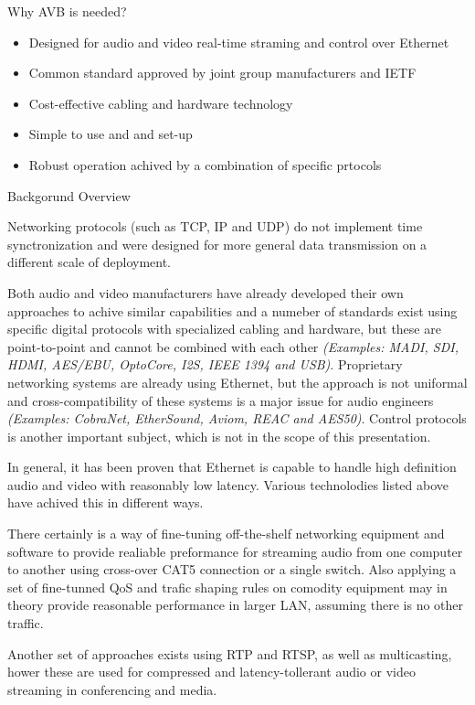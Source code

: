 { Why AVB is needed? }

\begin{itemize}
	\item Designed for audio and video real-time straming and control over Ethernet
	\item Common standard approved by joint group manufacturers and IETF
	\item Cost-effective cabling and hardware technology
	\item Simple to use and and set-up
	\item Robust operation achived by a combination of specific prtocols
\end{itemize}

{ Backgorund Overview }

Networking protocols (such as TCP, IP and UDP) do not implement time synctronization and
were designed for more general data transmission on a different scale of deployment.

Both audio and video manufacturers have already developed their own approaches to achive
similar capabilities and a numeber of standards exist using specific digital protocols with
specialized cabling and hardware, but these are point-to-point and cannot be combined with each other
\emph{(Examples: MADI, SDI, HDMI, AES/EBU, OptoCore, I2S, IEEE 1394 and USB)}.
Proprietary networking systems are already using Ethernet, but the approach is not uniformal
and cross-compatibility of these systems is a major issue for audio engineers
\emph{(Examples: CobraNet, EtherSound, Aviom, REAC and AES50)}.
Control protocols is another important subject, which is not in the scope of this presentation.

In general, it has been proven that Ethernet is capable to handle high definition audio and video
with reasonably low latency. Various technolodies listed above have achived this in different ways.

There certainly is a way of fine-tuning off-the-shelf networking equipment and software to provide
realiable preformance for streaming audio from one computer to another using cross-over CAT5 connection
or a single switch. Also applying a set of fine-tunned QoS and trafic shaping rules on comodity
equipment may in theory provide reasonable performance in larger LAN, assuming there is no other traffic.

Another set of approaches exists using RTP and RTSP, as well as multicasting, hower these
are used for compressed and latency-tollerant audio or video streaming in conferencing and media.



